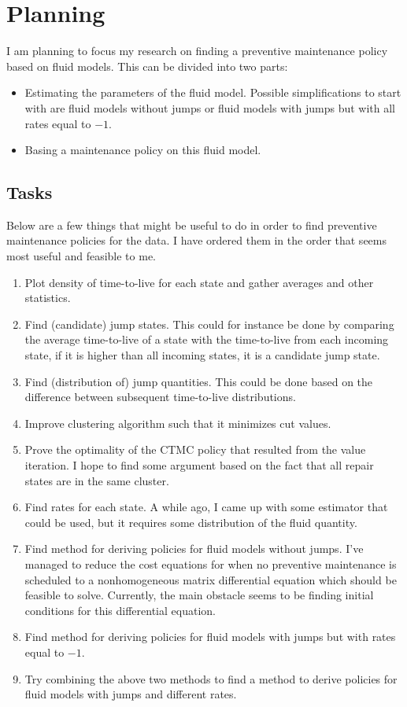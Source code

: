 \section{Planning}
I am planning to focus my research on finding a preventive maintenance policy based on fluid models. This can be divided into two parts:
\begin{itemize}
\item Estimating the parameters of the fluid model. Possible simplifications to start with are fluid models without jumps or fluid models with jumps but with all rates equal to $-1$.
\item Basing a maintenance policy on this fluid model.
\end{itemize}

\subsection{Tasks}
Below are a few things that might be useful to do in order to find preventive maintenance policies for the data. I have ordered them in the order that seems most useful and feasible to me.
\begin{enumerate}
\item Plot density of time-to-live for each state and gather averages and other statistics.
\item Find (candidate) jump states. This could for instance be done by comparing the average time-to-live of a state with the time-to-live from each incoming state, if it is higher than all incoming states, it is a candidate jump state.
\item Find (distribution of) jump quantities. This could be done based on the difference between subsequent time-to-live distributions.
\item Improve clustering algorithm such that it minimizes cut values.
\item Prove the optimality of the CTMC policy that resulted from the value iteration. I hope to find some argument based on the fact that all repair states are in the same cluster.
\item Find rates for each state. A while ago, I came up with some estimator that could be used, but it requires some distribution of the fluid quantity.
\item Find method for deriving policies for fluid models without jumps. I've managed to reduce the cost equations for when no preventive maintenance is scheduled to a nonhomogeneous matrix differential equation which should be feasible to solve. Currently, the main obstacle seems to be finding initial conditions for this differential equation.
\item Find method for deriving policies for fluid models with jumps but with rates equal to $-1$.
\item Try combining the above two methods to find a method to derive policies for fluid models with jumps and different rates.
\end{enumerate}

